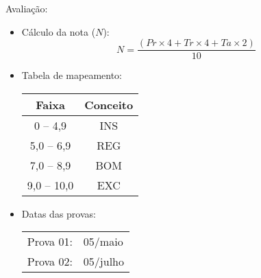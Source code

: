       \begin{slide}[toc=]{Avaliação:}
         \begin{itemize}
        \item Cálculo da nota ($N$):
            \begin{equation*}
	    N=\frac{( Pr \times 4 + Tr \times 4 + Ta \times 2 )} {10}
            \end{equation*}
          \item Tabela de mapeamento:
            \begin{table}
               \centering
               \begin{tabular}{c|c}
                  \hline\hline
                  \textbf{Faixa} & \textbf{Conceito}\\
                  \hline
                  0 -- 4,9 & INS\\
                  5,0 -- 6,9 & REG\\
                  7,0 -- 8,9 & BOM\\
                  9,0 -- 10,0 & EXC\\
                  \hline\hline
               \end{tabular}
            \end{table}
      \item Datas das provas:
            \begin{table}
               \centering
               \begin{tabular}{|l l|}
                  \hline
                  Prova 01: & 05/maio\\
                  Prova 02: & 05/julho\\
                  \hline
               \end{tabular}
            \end{table}
         \end{itemize}
      \end{slide}

